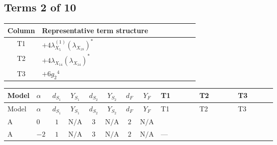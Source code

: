 \documentclass[8pt]{article}
\begin{document}
\begin{landscape}
\subsection*{Terms 2 of 10}
\begin{center}
\begin{tabular}{@{}c >{\raggedright\arraybackslash}p{0.82\linewidth}@{}}
\toprule
Column & Representative term structure \\
\midrule
T1 & \(\displaystyle +4 {\lambda_{X_{5}}^{(1)}} \left({\lambda_{X_{18}}}\right)^{*}\) \\
\midrule
T2 & \(\displaystyle +4 {\lambda_{X_{14}}} \left({\lambda_{X_{14}}}\right)^{*}\) \\
\midrule
T3 & \(\displaystyle +6 {g_2}^4\) \\
\midrule
\bottomrule
\end{tabular}
\end{center}
\smallskip
\tiny
\begin{longtable}{@{}llcccccc >{\raggedright\arraybackslash}p{0.21\linewidth} >{\raggedright\arraybackslash}p{0.21\linewidth} >{\raggedright\arraybackslash}p{0.21\linewidth}@{}}
\toprule
Model & $\alpha$ & $d_{S_1}$ & $Y_{S_1}$ & $d_{S_2}$ & $Y_{S_2}$ & $d_F$ & $Y_F$ & T1 & T2 & T3 \\
\midrule
\endfirsthead
\toprule
Model & $\alpha$ & $d_{S_1}$ & $Y_{S_1}$ & $d_{S_2}$ & $Y_{S_2}$ & $d_F$ & $Y_F$ & T1 & T2 & T3 \\
\midrule
\endhead
A & $0$ & $1$ & $\text{N/A}$ & $3$ & $\text{N/A}$ & $2$ & $\text{N/A}$ & \scriptsize\adjustbox{max width=\linewidth}{$\begin{gathered} +4 {\lambda_{X_{5}}^{(1)}} \left({\lambda_{X_{18}}}\right)^{*}\end{gathered}$} & \scriptsize\adjustbox{max width=\linewidth}{$\begin{gathered} +4 {\lambda_{X_{14}}} \left({\lambda_{X_{14}}}\right)^{*}\end{gathered}$} & \scriptsize\adjustbox{max width=\linewidth}{$\begin{gathered} +6 {g_2}^4\end{gathered}$} \\
\midrule
A & $-2$ & $1$ & $\text{N/A}$ & $3$ & $\text{N/A}$ & $2$ & $\text{N/A}$ & --- & \scriptsize\adjustbox{max width=\linewidth}{$\begin{gathered} +4 {\lambda_{X_{12}}} \left({\lambda_{X_{12}}}\right)^{*}\end{gathered}$} & \scriptsize\adjustbox{max width=\linewidth}{$\begin{gathered} +6 {g_2}^4\end{gathered}$} \\

\end{longtable}
\end{landscape}
\end{document}

